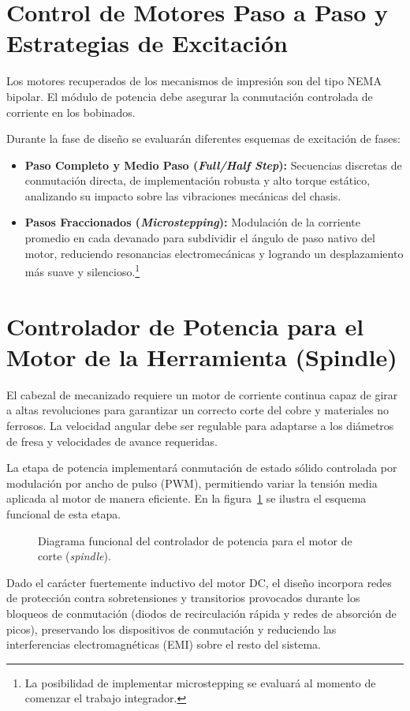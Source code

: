 \section{Control de Motores Paso a Paso y Estrategias de Excitación}
\label{sec:myie_paso_a_paso}

Los motores recuperados de los mecanismos de impresión son del tipo NEMA bipolar. El módulo de potencia debe asegurar 
la conmutación controlada de corriente en los bobinados.

Durante la fase de diseño se evaluarán diferentes esquemas de excitación de fases:
\begin{itemize}
  \item \textbf{Paso Completo y Medio Paso (\textit{Full/Half Step}):} Secuencias discretas de conmutación directa, de
    implementación robusta y alto torque estático, analizando su impacto sobre las vibraciones mecánicas del chasis.
  \item \textbf{Pasos Fraccionados (\textit{Microstepping}):} Modulación de la corriente promedio en cada devanado para
    subdividir el ángulo de paso nativo del motor, reduciendo resonancias electromecánicas y logrando un desplazamiento
    más suave y silencioso.\footnote{La posibilidad de implementar microstepping se evaluará al momento de comenzar el
    trabajo integrador.}
\end{itemize}

\section{Controlador de Potencia para el Motor de la Herramienta (Spindle)}
\label{sec:myie_spindle}

El cabezal de mecanizado requiere un motor de corriente continua capaz de girar a altas revoluciones para garantizar un
correcto corte del cobre y materiales no ferrosos. La velocidad angular debe ser regulable para adaptarse a los
diámetros de fresa y velocidades de avance requeridas.

La etapa de potencia implementará conmutación de estado sólido controlada por modulación por ancho de pulso (PWM),
permitiendo variar la tensión media aplicada al motor de manera eficiente. En la figura~\ref{crkt.ej4:driver_spindle} se
ilustra el esquema funcional de esta etapa.

\begin{figure}[!ht]
  \centering
  \resizebox{0.85\linewidth}{!}{}
  \caption{Diagrama funcional del controlador de potencia para el motor de corte (\textit{spindle}).}
  \label{crkt.ej4:driver_spindle}
\end{figure}

Dado el carácter fuertemente inductivo del motor DC, el diseño incorpora redes de protección contra sobretensiones y
transitorios provocados durante los bloqueos de conmutación (diodos de recirculación rápida y redes de absorción de
picos), preservando los dispositivos de conmutación y reduciendo las interferencias electromagnéticas (EMI) sobre el
resto del sistema.
